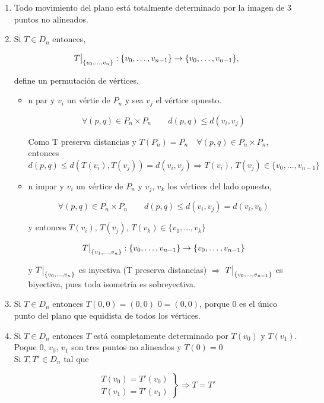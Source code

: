 \documentclass{article}
\newcommand\restr[2]{{%
  \left.\kern-\nulldelimiterspace %
  #1 %
  \vphantom{\big|} %
  \right|_{#2} %
  }}
\begin{document}
\begin{enumerate}[(1)]
\item Todo movimiento del plano está totalmente determinado por la imagen de 3 puntos no alineados.

\item Si \(T\in D_n\) entonces,

\[
\restr{T}{\{v_0,\ldots,v_n\}}:\{v_0,\ldots,v_{n-1}\}\rightarrow \{v_0,\ldots,v_{n-1}\},
\]

define un permutación de vértices.

\begin{itemize}
\item n par y $v_i$ un vértie de $P_n$ y sea $v_j$ el vértice opuesto.

\[
\forall (p,q)\in P_n\times P_n \qquad d(p,q) \leq d(v_i,v_j)
\]

Como T preserva distancias y $T(P_n)=P_n \quad \forall (p,q)\in P_n\times P_n$, entonces $d(p,q)\leq d(T(v_i),T(v_j))=d(v_i,v_j) \Rightarrow T(v_i),\,T(v_j) \in \{v_0,\ldots,v_{n-1}\}$
\item n impar y $v_i$ un vértice de $P_n$ y $v_j$, $v_k$ los vértices del lado opuesto,

\[
\forall (p,q) \in P_n\times P_n \qquad d(p,q) \leq d(v_i,v_j) = d(v_i,v_k)
\]

y entonces $T(v_i),\,T(v_j),\,T(v_k) \in \{v_1,\ldots,v_k\}$

\[
\restr{T}{\{v_1,\ldots,v_n\}}:\{v_0,\ldots,v_{n-1}\}\rightarrow \{v_0,\ldots,v_{n-1}\}
\]

y $\restr{T}{\{v_0,\ldots,v_n\}}$ es inyectiva (T preserva distancias) $\Rightarrow$ $\restr{T}{\{v_0,\ldots,v_{n-1}\}}$ es biyectiva, pues toda isometría es sobreyectiva.
\end{itemize}

\item Si $T \in D_n$ entonces $T(0,0)=(0,0)$ $0=(0,0)$, porque $0$ es el único punto del plano que equidista de todos los vértices.

\item Si $T \in D_n$ entonces $T$ está completamente determinado por $T(v_0)$ y $T(v_1)$. Poque $0,\, v_0,\, v_1$ son tres puntos no alineados y $T(0)=0$ \\

Si $T,T' \in D_n$ tal que 

\[
\left.\begin{array}{c}
T(v_0)=T'(v_0) \\
T(v_1)=T'(v_1)
\end{array}
\right\rbrace 
\Rightarrow T=T'
\]


\end{enumerate}
\end{document}

